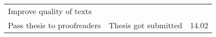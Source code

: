 \begin{table}[H]
{\begin{tabular}{|l|l|l|}
Improve quality of texts                                                                                                   &                                    &                       \\ \cline{1-1}
Pass thesis to proofreaders                                                                                                & Thesis got submitted               & 14.02                 \\ \hline
\end{tabular}%
}
\label{tab:stoercodeDetailed}
\end{table}